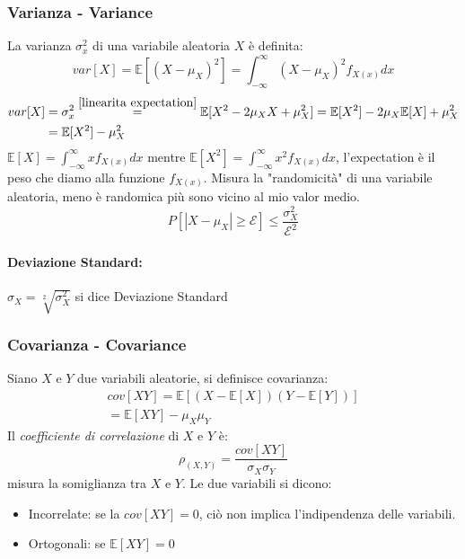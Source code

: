         \subsubsection{Varianza - Variance}
            La varianza $\sigma^2_x$ di una variabile aleatoria $X$ è definita:
            \[
                var[X] = \mathbb{E}[(X-\mu_X)^2] = \int_{-\infty}^{\infty} (X-\mu_X)^2f_{X(x)}dx
            \]  
            \begin{align}
                var[X] &= \sigma^2_x \overset{\ref{linearita expectation}}{=} \mathbb{E}[X^2-2\mu_XX+\mu_X^2] = \mathbb{E}[X^2]-2\mu_X\mathbb{E}[X]+\mu_X^2 \nonumber \\
                           &= \mathbb{E}[X^2]-\mu_X^2 \nonumber 
            \end{align}
            $\mathbb{E}[X] = \int_{-\infty}^{\infty} xf_{X(x)}dx$ mentre $\mathbb{E}[X^2] = \int_{-\infty}^{\infty} x^2f_{X(x)}dx$, l'expectation è il peso che diamo alla funzione $f_{X(x)}$.  
            Misura la "randomicità" di una variabile aleatoria, meno è randomica più sono vicino al mio valor medio.
            \[
                P[|X-\mu_X|\geq \mathcal{E}]\leq \frac{\sigma^2_X}{\mathcal{E}^2}
            \]
            \paragraph{Deviazione Standard:} $\sigma_X = \sqrt[2]{\sigma^2_X}$ si dice Deviazione Standard
        \subsubsection{Covarianza - Covariance}
            Siano $X$ e $Y$ due variabili aleatorie, si definisce covarianza:
            \begin{gather}
                cov[XY] = \mathbb{E}[(X-\mathbb{E}[X])(Y-\mathbb{E}[Y])]\nonumber\\
                = \mathbb{E}[XY]-\mu_X\mu_Y\nonumber
            \end{gather}
            Il \emph{coefficiente di correlazione} di $X$ e $Y$ è:
            \[
                \rho_{(X,Y)} = \frac{cov[XY]}{\sigma_X\sigma_Y}
            \]
            misura la somiglianza tra $X$ e $Y$. Le due variabili si dicono:
            \begin{itemize}
                \item {
                    Incorrelate: se la $cov[XY] =0$, ciò non implica l'indipendenza delle variabili.
                }
                \item {
                    Ortogonali: se $\mathbb{E}[XY] = 0$
                }
            \end{itemize}
